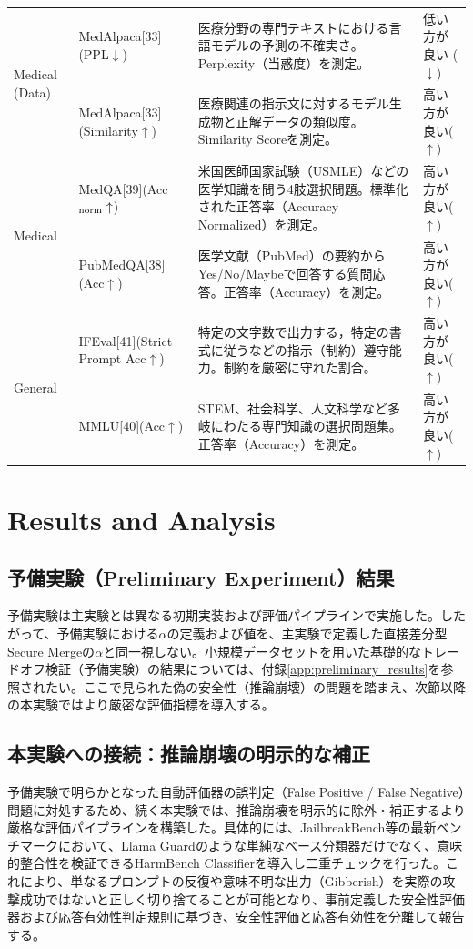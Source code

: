 \documentclass{article}
\begin{document}
\begin{table}[htbp]
\begin{tabularx}{\textwidth}{p{2.0cm}p{3.3cm}Xp{2.2cm}}
\midrule
\multirow{2}{*}{Medical (Data)}
& MedAlpaca[33](PPL$\downarrow$) & 医療分野の専門テキストにおける言語モデルの予測の不確実さ。Perplexity（当惑度）を測定。 & 低い方が良い ($\downarrow$) \\
& MedAlpaca[33](Similarity$\uparrow$) & 医療関連の指示文に対するモデル生成物と正解データの類似度。Similarity Scoreを測定。 & 高い方が良い($\uparrow$) \\
\midrule
\multirow{2}{*}{Medical}
& MedQA[39](Acc$_{\rm norm}\uparrow$) & 米国医師国家試験（USMLE）などの医学知識を問う4肢選択問題。標準化された正答率（Accuracy Normalized）を測定。 & 高い方が良い($\uparrow$) \\
& PubMedQA[38](Acc$\uparrow$) & 医学文献（PubMed）の要約からYes/No/Maybeで回答する質問応答。正答率（Accuracy）を測定。 & 高い方が良い($\uparrow$) \\
\midrule
\multirow{2}{*}{General}
& IFEval[41](Strict Prompt Acc$\uparrow$) & 特定の文字数で出力する，特定の書式に従うなどの指示（制約）遵守能力。制約を厳密に守れた割合。 & 高い方が良い($\uparrow$) \\
& MMLU[40](Acc$\uparrow$) & STEM、社会科学、人文科学など多岐にわたる専門知識の選択問題集。正答率（Accuracy）を測定。 & 高い方が良い($\uparrow$) \\
\bottomrule
\end{tabularx}
\end{table}


\section{Results and Analysis}

\subsection{予備実験（Preliminary Experiment）結果}
予備実験は主実験とは異なる初期実装および評価パイプラインで実施した。したがって、予備実験における\(\alpha\)の定義および値を、主実験で定義した直接差分型Secure Mergeの\(\alpha\)と同一視しない。小規模データセットを用いた基礎的なトレードオフ検証（予備実験）の結果については、付録\ref{app:preliminary_results}を参照されたい。ここで見られた偽の安全性（推論崩壊）の問題を踏まえ、次節以降の本実験ではより厳密な評価指標を導入する。


\subsection{本実験への接続：推論崩壊の明示的な補正}
予備実験で明らかとなった自動評価器の誤判定（False Positive / False Negative）問題に対処するため、続く本実験では、推論崩壊を明示的に除外・補正するより厳格な評価パイプラインを構築した。具体的には、JailbreakBench等の最新ベンチマークにおいて、Llama Guardのような単純なベース分類器だけでなく、意味的整合性を検証できるHarmBench Classifierを導入し二重チェックを行った。これにより、単なるプロンプトの反復や意味不明な出力（Gibberish）を実際の攻撃成功ではないと正しく切り捨てることが可能となり、事前定義した安全性評価器および応答有効性判定規則に基づき、安全性評価と応答有効性を分離して報告する。
\end{document}
